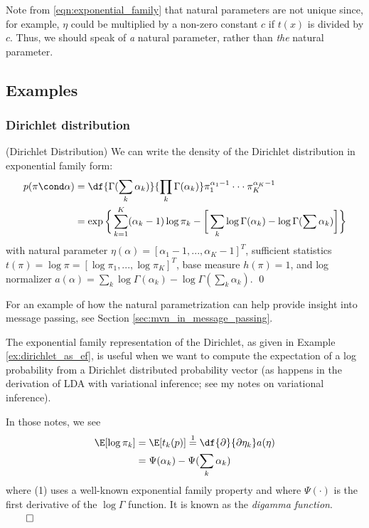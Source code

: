 \documentclass{article} %
\begin{document}
\begin{remark}{}
\label{rk:nonuniqueness_of_natural_parameter}
Note from \eqref{eqn:exponential_family} that natural parameters are not unique since,  for example,  $\eta$ could be multiplied by a non-zero constant $c$ if $t(x)$ is divided by $c$.  Thus,  we should speak of \textit{a} natural parameter,  rather than \textit{the} natural parameter.
\end{remark}

\subsection{Examples}
\subsubsection{Dirichlet distribution}

\begin{example}{(Dirichlet Distribution)} 
\label{ex:dirichlet_as_ef} We can write the density of the Dirichlet distribution in exponential family form:
\begin{align*}
p (\pi \cond\alpha) &= \df{\Gamma(\sum_k \alpha_k)}{\prod_k \Gamma (\alpha_k) } \pi_1^{\alpha_1 -1} \cdot \cdot \cdot \pi_K^{\alpha_K -1} \\
&= \exp \bigg\{ \sum_{k=1}^K (\alpha_k -1) \log \pi_k - \bigg[ \sum_k \log \Gamma (\alpha_k)-  \log \Gamma (\sum \alpha_k) \bigg]  \bigg\}
\end{align*}
with natural parameter $\eta(\alpha) = [\alpha_1 -1, ..., \alpha_K -1]^T$, sufficient statistics $t(\pi) = \log \pi = [\log \pi_1, ..., \log \pi_K]^T$, base measure $h(\pi)=1$, and log normalizer $a(\alpha) =  \sum_k \log \Gamma (\alpha_k ) - \log \Gamma (\sum_k \alpha_k)$. 
\qed 
\end{example} 

For an example of how the natural parametrization can help provide insight into message passing,  see Section \ref{sec:mvn_in_message_passing}.

\begin{remark} The exponential family representation of the Dirichlet, as given in Example \ref{ex:dirichlet_as_ef}, is useful when we want to compute the expectation of a log probability from a Dirichlet distributed probability vector (as happens in the derivation of LDA with variational inference; see my notes on variational inference).  

In those notes,  we see
\begin{align} 
\E [ \log \pi_k] &= \E [t_k(p)] \stackrel{1}{=} \df{\partial}{\partial \eta_k} a(\eta) \nonumber \\
&=\Psi(\alpha_k) -  \Psi(\sum_k  \alpha_k) \label{eqn:expectation_of_log_probability} 
\end{align}
where (1) uses a well-known exponential family property and where $\Psi(\cdot)$ is the first derivative of the $\log \Gamma$ function.   It is known as the \textit{digamma function}.  $\qed$

\end{remark}
\end{document}
